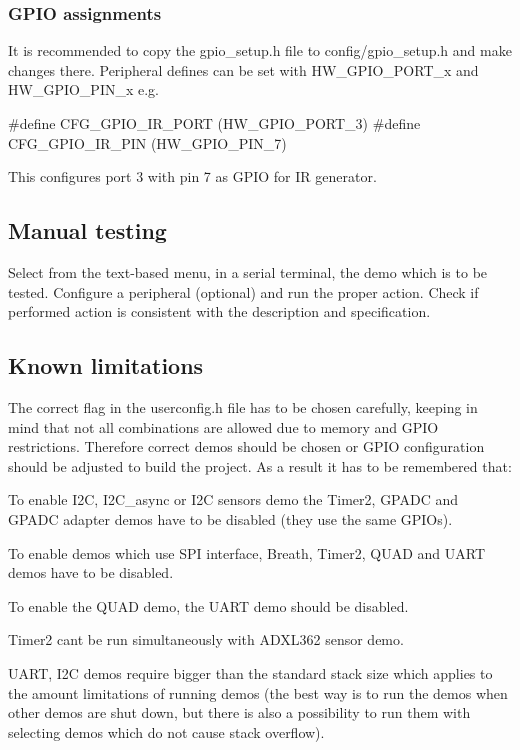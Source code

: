\subsubsection*{G\+P\+I\+O assignments}

It is recommended to copy the {\ttfamily gpio\+\_\+setup.\+h} file to {\ttfamily config/gpio\+\_\+setup.\+h} and make changes there. Peripheral defines can be set with H\+W\+\_\+\+G\+P\+I\+O\+\_\+\+P\+O\+R\+T\+\_\+x and H\+W\+\_\+\+G\+P\+I\+O\+\_\+\+P\+I\+N\+\_\+x e.\+g.


\begin{DoxyCode}
\textcolor{preprocessor}{#define CFG\_GPIO\_IR\_PORT                (HW\_GPIO\_PORT\_3)}
\textcolor{preprocessor}{#define CFG\_GPIO\_IR\_PIN                 (HW\_GPIO\_PIN\_7)}
\end{DoxyCode}


This configures port 3 with pin 7 as G\+P\+I\+O for I\+R generator.

\subsection*{Manual testing}

Select from the text-\/based menu, in a serial terminal, the demo which is to be tested. Configure a peripheral (optional) and run the proper action. Check if performed action is consistent with the description and specification.

\subsection*{Known limitations}

The correct flag in the {\ttfamily userconfig.\+h} file has to be chosen carefully, keeping in mind that not all combinations are allowed due to memory and G\+P\+I\+O restrictions. Therefore correct demos should be chosen or G\+P\+I\+O configuration should be adjusted to build the project. As a result it has to be remembered that\+:


\begin{DoxyItemize}
\item To enable I2\+C, I2\+C\+\_\+async or I2\+C sensors demo the Timer2, G\+P\+A\+D\+C and G\+P\+A\+D\+C adapter demos have to be disabled (they use the same G\+P\+I\+Os).
\item To enable demos which use S\+P\+I interface, Breath, Timer2, Q\+U\+A\+D and U\+A\+R\+T demos have to be disabled.
\item To enable the Q\+U\+A\+D demo, the U\+A\+R\+T demo should be disabled.
\item Timer2 can\textquotesingle{}t be run simultaneously with A\+D\+X\+L362 sensor demo.
\item U\+A\+R\+T, I2\+C demos require bigger than the standard stack size which applies to the amount limitations of running demos (the best way is to run the demos when other demos are shut down, but there is also a possibility to run them with selecting demos which do not cause stack overflow).
\end{DoxyItemize}

